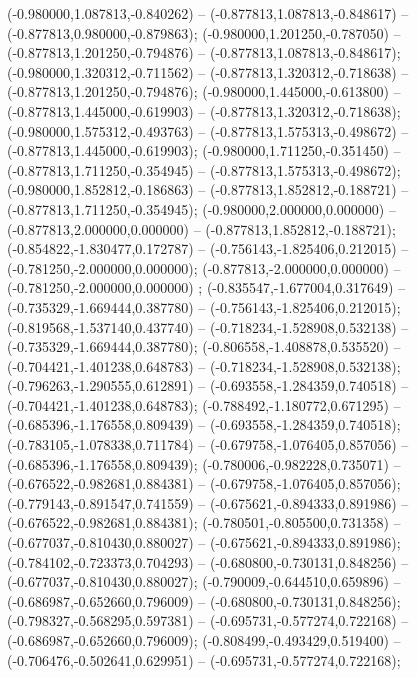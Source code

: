  (-0.980000,1.087813,-0.840262) -- (-0.877813,1.087813,-0.848617) -- (-0.877813,0.980000,-0.879863);
 (-0.980000,1.201250,-0.787050) -- (-0.877813,1.201250,-0.794876) -- (-0.877813,1.087813,-0.848617);
 (-0.980000,1.320312,-0.711562) -- (-0.877813,1.320312,-0.718638) -- (-0.877813,1.201250,-0.794876);
 (-0.980000,1.445000,-0.613800) -- (-0.877813,1.445000,-0.619903) -- (-0.877813,1.320312,-0.718638);
 (-0.980000,1.575312,-0.493763) -- (-0.877813,1.575313,-0.498672) -- (-0.877813,1.445000,-0.619903);
 (-0.980000,1.711250,-0.351450) -- (-0.877813,1.711250,-0.354945) -- (-0.877813,1.575313,-0.498672);
 (-0.980000,1.852812,-0.186863) -- (-0.877813,1.852812,-0.188721) -- (-0.877813,1.711250,-0.354945);
 (-0.980000,2.000000,0.000000) -- (-0.877813,2.000000,0.000000) -- (-0.877813,1.852812,-0.188721);
 (-0.854822,-1.830477,0.172787) -- (-0.756143,-1.825406,0.212015) -- (-0.781250,-2.000000,0.000000);
 (-0.877813,-2.000000,0.000000) -- (-0.781250,-2.000000,0.000000) ;
 (-0.835547,-1.677004,0.317649) -- (-0.735329,-1.669444,0.387780) -- (-0.756143,-1.825406,0.212015);
 (-0.819568,-1.537140,0.437740) -- (-0.718234,-1.528908,0.532138) -- (-0.735329,-1.669444,0.387780);
 (-0.806558,-1.408878,0.535520) -- (-0.704421,-1.401238,0.648783) -- (-0.718234,-1.528908,0.532138);
 (-0.796263,-1.290555,0.612891) -- (-0.693558,-1.284359,0.740518) -- (-0.704421,-1.401238,0.648783);
 (-0.788492,-1.180772,0.671295) -- (-0.685396,-1.176558,0.809439) -- (-0.693558,-1.284359,0.740518);
 (-0.783105,-1.078338,0.711784) -- (-0.679758,-1.076405,0.857056) -- (-0.685396,-1.176558,0.809439);
 (-0.780006,-0.982228,0.735071) -- (-0.676522,-0.982681,0.884381) -- (-0.679758,-1.076405,0.857056);
 (-0.779143,-0.891547,0.741559) -- (-0.675621,-0.894333,0.891986) -- (-0.676522,-0.982681,0.884381);
 (-0.780501,-0.805500,0.731358) -- (-0.677037,-0.810430,0.880027) -- (-0.675621,-0.894333,0.891986);
 (-0.784102,-0.723373,0.704293) -- (-0.680800,-0.730131,0.848256) -- (-0.677037,-0.810430,0.880027);
 (-0.790009,-0.644510,0.659896) -- (-0.686987,-0.652660,0.796009) -- (-0.680800,-0.730131,0.848256);
 (-0.798327,-0.568295,0.597381) -- (-0.695731,-0.577274,0.722168) -- (-0.686987,-0.652660,0.796009);
 (-0.808499,-0.493429,0.519400) -- (-0.706476,-0.502641,0.629951) -- (-0.695731,-0.577274,0.722168);
